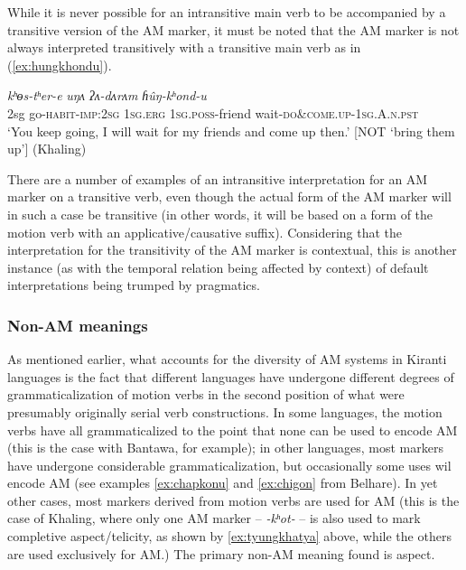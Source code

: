 \documentclass[oneside,a4paper,11pt]{article}
\newcommand{\ipa}[1]{{\phon\textit{#1}}}
\newcommand{\rouge}[1]{{\color{red}#1}}
\begin{document}
While it is never possible for an intransitive main verb to be accompanied by a transitive version of the AM marker, it must be noted that the AM marker is not always interpreted transitively with a transitive main verb as in (\ref{ex:hungkhondu}). 

\begin{exe}  
\ex \label{ex:hungkhondu}
 \gll  \ipa{ʔīn} \ipa{kʰɵs-tʰer-e} \ipa{uŋʌ} \ipa{ʔʌ-dʌrʌm} \ipa{ɦûŋ-\rouge{kʰond}-u} \\
 2sg go-\textsc{habit}-\textsc{imp}:\textsc{2sg} \textsc{1sg}.\textsc{erg} \textsc{1sg}.\textsc{poss}-friend wait-\rouge{\textsc{do\&come.up}}-\textsc{1sg.A.n.pst} \\
\glt `You keep going, I will wait for my friends and come up then.' [NOT `bring them up'] (Khaling)
\end{exe}

 There are a number of examples of an intransitive interpretation for an AM marker on a transitive verb, even though the actual form of the AM marker will in such a case be transitive (in other words, it will be based on a form of the motion verb with an applicative/causative suffix).  Considering that the interpretation for the transitivity of the AM marker is contextual, this is another instance (as with the temporal relation being affected by context) of default interpretations being trumped by pragmatics.
  

 \subsubsection{Non-AM meanings} \label{sec:khaling.non.am}
As mentioned earlier, what accounts for the diversity of AM systems in Kiranti languages is the fact that different languages have undergone different degrees of grammaticalization of motion verbs in the second position of what were presumably originally serial verb constructions.  In some languages, the motion verbs have all grammaticalized to the point that none can be used to encode AM (this is the case with Bantawa, for example); in other languages, most markers have undergone considerable grammaticalization, but occasionally some uses wil encode AM (see examples  \ref{ex:chapkonu} and \ref{ex:chigon} from Belhare).  In yet other cases, most markers derived from motion verbs are used for AM (this is the case of Khaling, where only one AM marker -- \ipa{-kʰot-} -- is also used to mark completive aspect/telicity, as shown by \ref{ex:tyungkhatya} above, while the others are used exclusively for AM.)  
The primary non-AM meaning found is aspect.
\end{document}
